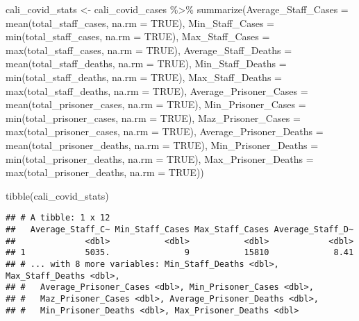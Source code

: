 \documentclass[
]{article}
\newenvironment{Shaded}{\begin{snugshade}}{\end{snugshade}}
\newcommand{\AttributeTok}[1]{\textcolor[rgb]{0.77,0.63,0.00}{#1}}
\newcommand{\ConstantTok}[1]{\textcolor[rgb]{0.00,0.00,0.00}{#1}}
\newcommand{\FunctionTok}[1]{\textcolor[rgb]{0.00,0.00,0.00}{#1}}
\newcommand{\NormalTok}[1]{#1}
\newcommand{\OtherTok}[1]{\textcolor[rgb]{0.56,0.35,0.01}{#1}}
\newcommand{\SpecialCharTok}[1]{\textcolor[rgb]{0.00,0.00,0.00}{#1}}
\begin{document}
\begin{Shaded}
\begin{Highlighting}[]
\NormalTok{cali\_covid\_stats }\OtherTok{\textless{}{-}}\NormalTok{ cali\_covid\_cases }\SpecialCharTok{\%\textgreater{}\%}
  \FunctionTok{summarize}\NormalTok{(}\AttributeTok{Average\_Staff\_Cases =} \FunctionTok{mean}\NormalTok{(total\_staff\_cases, }\AttributeTok{na.rm =} \ConstantTok{TRUE}\NormalTok{),}
            \AttributeTok{Min\_Staff\_Cases =} \FunctionTok{min}\NormalTok{(total\_staff\_cases, }\AttributeTok{na.rm =} \ConstantTok{TRUE}\NormalTok{),}
            \AttributeTok{Max\_Staff\_Cases =} \FunctionTok{max}\NormalTok{(total\_staff\_cases, }\AttributeTok{na.rm =} \ConstantTok{TRUE}\NormalTok{),}
            \AttributeTok{Average\_Staff\_Deaths =} \FunctionTok{mean}\NormalTok{(total\_staff\_deaths, }\AttributeTok{na.rm =} \ConstantTok{TRUE}\NormalTok{),}
            \AttributeTok{Min\_Staff\_Deaths =} \FunctionTok{min}\NormalTok{(total\_staff\_deaths, }\AttributeTok{na.rm =} \ConstantTok{TRUE}\NormalTok{),}
            \AttributeTok{Max\_Staff\_Deaths =} \FunctionTok{max}\NormalTok{(total\_staff\_deaths, }\AttributeTok{na.rm =} \ConstantTok{TRUE}\NormalTok{),}
            \AttributeTok{Average\_Prisoner\_Cases =} \FunctionTok{mean}\NormalTok{(total\_prisoner\_cases, }\AttributeTok{na.rm =} \ConstantTok{TRUE}\NormalTok{),}
            \AttributeTok{Min\_Prisoner\_Cases =} \FunctionTok{min}\NormalTok{(total\_prisoner\_cases, }\AttributeTok{na.rm =} \ConstantTok{TRUE}\NormalTok{),}
            \AttributeTok{Maz\_Prisoner\_Cases =} \FunctionTok{max}\NormalTok{(total\_prisoner\_cases, }\AttributeTok{na.rm =} \ConstantTok{TRUE}\NormalTok{),}
            \AttributeTok{Average\_Prisoner\_Deaths =} \FunctionTok{mean}\NormalTok{(total\_prisoner\_deaths, }\AttributeTok{na.rm =} \ConstantTok{TRUE}\NormalTok{),}
            \AttributeTok{Min\_Prisoner\_Deaths =} \FunctionTok{min}\NormalTok{(total\_prisoner\_deaths, }\AttributeTok{na.rm =} \ConstantTok{TRUE}\NormalTok{),}
            \AttributeTok{Max\_Prisoner\_Deaths =} \FunctionTok{max}\NormalTok{(total\_prisoner\_deaths, }\AttributeTok{na.rm =} \ConstantTok{TRUE}\NormalTok{))}

\FunctionTok{tibble}\NormalTok{(cali\_covid\_stats)}
\end{Highlighting}
\end{Shaded}

\begin{verbatim}
## # A tibble: 1 x 12
##   Average_Staff_C~ Min_Staff_Cases Max_Staff_Cases Average_Staff_D~
##              <dbl>           <dbl>           <dbl>            <dbl>
## 1            5035.               9           15810             8.41
## # ... with 8 more variables: Min_Staff_Deaths <dbl>, Max_Staff_Deaths <dbl>,
## #   Average_Prisoner_Cases <dbl>, Min_Prisoner_Cases <dbl>,
## #   Maz_Prisoner_Cases <dbl>, Average_Prisoner_Deaths <dbl>,
## #   Min_Prisoner_Deaths <dbl>, Max_Prisoner_Deaths <dbl>
\end{verbatim}
\end{document}
